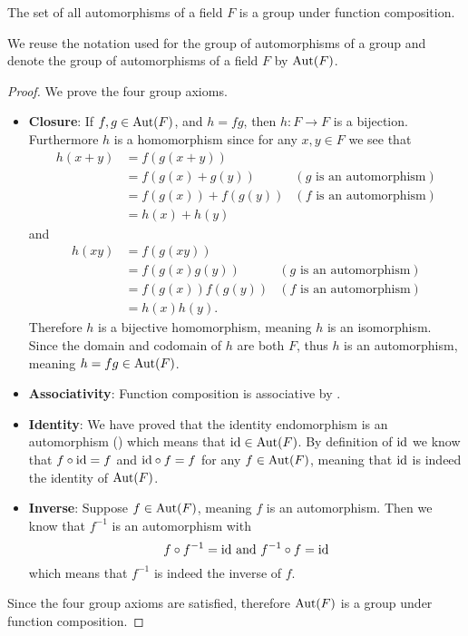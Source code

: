 \begin{proposition}
    The set of all automorphisms of a field $F$ is a group under function composition.
\end{proposition}
\begin{remark}
    We reuse the notation used for the group of automorphisms of a group and denote the group of automorphisms of a field $F$ by $\mathrm{Aut}(F)$.
\end{remark}
\begin{proof}
    We prove the four group axioms.
    \begin{itemize}
        \item \textbf{Closure}: If $f, g \in \mathrm{Aut}(F)$, and $h = fg$, then $h: F \to F$ is a bijection. Furthermore $h$ is a homomorphism since for any $x, y \in F$ we see that
        \begin{align*}
            h(x+y) &= f(g(x + y))\\
            &= f(g(x) + g(y)) & (g \text{ is an automorphism})\\
            &= f(g(x)) + f(g(y)) & (f \text{ is an automorphism})\\
            &= h(x) + h(y)
        \end{align*}
        and
        \begin{align*}
            h(xy) &= f(g(xy))\\
            &= f(g(x)g(y)) & (g \text{ is an automorphism})\\
            &= f(g(x))f(g(y)) & (f \text{ is an automorphism})\\
            &= h(x)h(y).
        \end{align*}
        Therefore $h$ is a bijective homomorphism, meaning $h$ is an isomorphism. Since the domain and codomain of $h$ are both $F$, thus $h$ is an automorphism, meaning $h = fg \in \mathrm{Aut}(F)$.

        \item \textbf{Associativity}: Function composition is associative by .

        \item \textbf{Identity}: We have proved that the identity endomorphism is an automorphism () which means that $\mathrm{id} \in \mathrm{Aut}(F)$. By definition of $\mathrm{id}$ we know that $f\circ\mathrm{id} = f$ and $\mathrm{id}\circ f = f$ for any $f \in \mathrm{Aut}(F)$, meaning that $\mathrm{id}$ is indeed the identity of $\mathrm{Aut}(F)$.

        \item \textbf{Inverse}: Suppose $f \in \mathrm{Aut}(F)$, meaning $f$ is an automorphism. Then we know that $f^{-1}$ is an automorphism with
        \[
            f\circ f^{-1} = \mathrm{id} \text{ and } f^{-1} \circ f = \mathrm{id}
        \]
        which means that $f^{-1}$ is indeed the inverse of $f$.
    \end{itemize}
    Since the four group axioms are satisfied, therefore $\mathrm{Aut}(F)$ is a group under function composition.
\end{proof}

